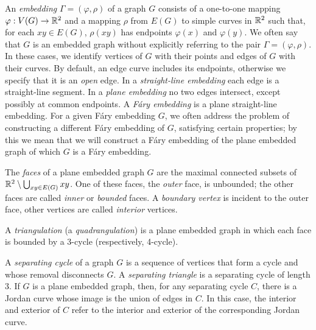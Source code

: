 An \emph{embedding} $\Gamma=(\varphi,\rho)$ of a graph $G$ consists
of a one-to-one mapping $\varphi:V(G)\to\mathbb{R}^2$ and a mapping $\rho$ from
$E(G)$ to simple curves in $\mathbb{R}^2$ such that, for each $xy\in E(G)$, $\rho(xy)$
has endpoints $\varphi(x)$ and $\varphi(y)$.
We often say that $G$ is an embedded graph
without explicitly referring to the pair $\Gamma=(\varphi,\rho)$.
In these cases, we identify vertices of $G$ with their
points and edges of $G$ with their curves. By default, an edge curve includes
its endpoints, otherwise we specify that it is an \emph{open} edge.
%
In a \emph{straight-line embedding} each edge is a straight-line segment. In a \emph{plane embedding} no two edges intersect, except possibly at common endpoints. A \emph{F\'ary embedding} is a plane straight-line embedding. For a given F\'ary embedding $G$, we often address the problem of constructing a different F\'ary embedding of $G$, satisfying certain properties; by this we mean that we will construct a F\'ary embedding of the plane embedded graph of which $G$ is a F\'ary embedding.

The \emph{faces} of a plane embedded graph $G$ are the maximal connected
subsets of $\mathbb{R}^2\setminus\bigcup_{xy\in E(G)} xy$.  One of
these faces, the \emph{outer} face, is unbounded; the other faces are called \emph{inner} or \emph{bounded} faces. A {\em boundary vertex} is incident to the outer face, other vertices are called \emph{interior} vertices.

A \emph{triangulation} (a \emph{quadrangulation}) is a plane embedded graph in which each face is bounded by a 3-cycle (respectively, 4-cycle). 

A \emph{separating cycle} of a graph $G$ is a sequence of vertices
that form a cycle and whose removal disconnects $G$.  A \emph{separating triangle} is
a separating cycle of length 3.  
If $G$ is a plane embedded graph, then,
for any separating cycle $C$, there is a 
Jordan curve whose image
is the union of edges in $C$.  In this case, the interior and exterior of
$C$ refer to the interior and exterior of the corresponding Jordan curve.


